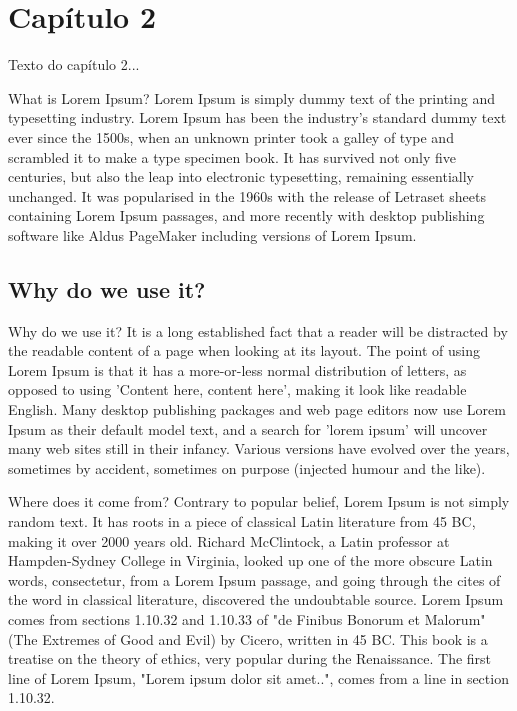 \documentclass{article}
\begin{document}
\newpage
\section{Capítulo 2}
Texto do capítulo 2...

What is Lorem Ipsum?
Lorem Ipsum is simply dummy text of the printing and typesetting industry. Lorem Ipsum has been the industry's standard dummy text ever since the 1500s, when an unknown printer took a galley of type and scrambled it to make a type specimen book. It has survived not only five centuries, but also the leap into electronic typesetting, remaining essentially unchanged. It was popularised in the 1960s with the release of Letraset sheets containing Lorem Ipsum passages, and more recently with desktop publishing software like Aldus PageMaker including versions of Lorem Ipsum.

\subsection{Why do we use it?}
Why do we use it?
It is a long established fact that a reader will be distracted by the readable content of a page when looking at its layout. The point of using Lorem Ipsum is that it has a more-or-less normal distribution of letters, as opposed to using 'Content here, content here', making it look like readable English. Many desktop publishing packages and web page editors now use Lorem Ipsum as their default model text, and a search for 'lorem ipsum' will uncover many web sites still in their infancy. Various versions have evolved over the years, sometimes by accident, sometimes on purpose (injected humour and the like).

Where does it come from?
Contrary to popular belief, Lorem Ipsum is not simply random text. It has roots in a piece of classical Latin literature from 45 BC, making it over 2000 years old. Richard McClintock, a Latin professor at Hampden-Sydney College in Virginia, looked up one of the more obscure Latin words, consectetur, from a Lorem Ipsum passage, and going through the cites of the word in classical literature, discovered the undoubtable source. Lorem Ipsum comes from sections 1.10.32 and 1.10.33 of "de Finibus Bonorum et Malorum" (The Extremes of Good and Evil) by Cicero, written in 45 BC. This book is a treatise on the theory of ethics, very popular during the Renaissance. The first line of Lorem Ipsum, "Lorem ipsum dolor sit amet..", comes from a line in section 1.10.32.
\end{document}
